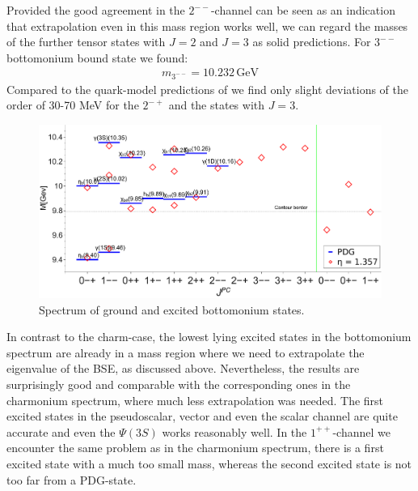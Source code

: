 Provided the good agreement in the $2^{--}$-channel can be seen as an indication that 
extrapolation even in this mass region works well, we can regard the masses of the 
further tensor states with $J=2$ and $J=3$ as solid predictions. For $3^{--}$ bottomonium bound state we found:
\begin{align}
%
  m_{3^{--}}= 10.232 \,\mbox{GeV}
%
\end{align}
Compared to the quark-model predictions of \cite{Ebert:2011jc}
we find only slight deviations of the order of 30-70 MeV for the $2^{-+}$ and the states 
with $J=3$.
%
\begin{figure}[t]
  \begin{center}
    \includegraphics[width=0.999\textwidth]{figures/spectrum_bb}
    \caption{Spectrum of ground and excited bottomonium states.}\label{fig:bottom}
  \end{center}
\end{figure}
%
In contrast to the charm-case, the lowest lying excited states in the bottomonium spectrum are
already in a mass region where we need to extrapolate the eigenvalue of the BSE, as discussed
above. Nevertheless, the results are surprisingly good and comparable with the corresponding ones in the charmonium spectrum, where much less
extrapolation was needed. The first excited states in the pseudoscalar, vector and even the
scalar channel are quite accurate and even the $\Psi(3S)$ works reasonably well. In the $1^{++}$-channel
we encounter the same problem as in the charmonium spectrum, there is a first excited state 
with a much too small mass, whereas the second excited state is not too far from a PDG-state.
%
%
%
%
%
%
